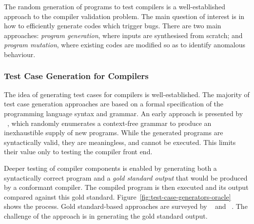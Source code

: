 The random generation of programs to test compilers is a well-established approach to the compiler validation problem. The main question of interest is in how to efficiently generate codes which trigger bugs. There are two main approaches: \emph{program generation}, where inputs are synthesised from scratch; and \emph{program mutation}, where existing codes are modified so as to identify anomalous behaviour.


\subsubsection{Test Case Generation for Compilers}

The idea of generating test cases for compilers is well-established. The majority of test case generation approaches are based on a formal specification of the programming language syntax and grammar.
An early approach is presented by \citeauthor{Hanford1970a}~\cite{Hanford1970a}, which randomly enumerates a context-free grammar to produce an inexhaustible supply of new programs. While the generated programs are syntactically valid, they are meaningless, and cannot be executed. This limits their value only to testing the compiler front end.

Deeper testing of compiler components is enabled by generating both a syntactically correct program and a \emph{gold standard output} that would be produced by a conformant compiler. The compiled program is then executed and its output compared against this gold standard. Figure~\ref{fig:test-case-generators-oracle} shows the process. Gold standard-based approaches are surveyed by \citeauthor{Boujarwah1997}~\cite{Boujarwah1997} and \citeauthor{Kossatchev2005}~\cite{Kossatchev2005}. The challenge of the approach is in generating the gold standard output.

